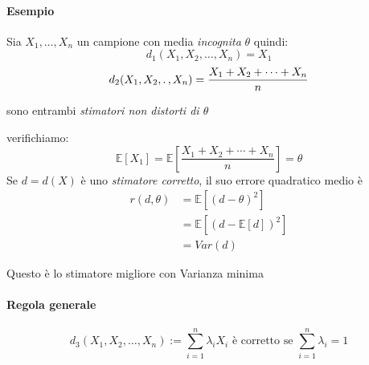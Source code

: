 \documentclass[]{article}
\newcommand{\ev}{\mathbb{E}[X]}
\renewcommand{\ev}[1]{\mathbb{E}[#1]}
\begin{document}
    \paragraph{Esempio} Sia $X_1, \ldots, X_n$ un campione con media \textit{incognita} $\theta$ quindi:
    \[ d_1 (X_1, X_2, \ldots, X_n) = X_1 \]
    \[ d_2 (X_1, X_2, \ldotp, X_n) = \frac{X_1 + X_2 + \cdots + X_n}{n} \]
    \centerline{sono entrambi \textit{stimatori non distorti di $\theta$}}
    verifichiamo:
    \[ \ev{X_1} = \ev{\frac{X_1 + X_2 + \cdots + X_n}{n}} = \theta \]
    Se $d = d(X)$ è uno \textit{stimatore corretto}, il suo errore quadratico medio è
    \begin{equation*}
        \begin{split}
            r(d, \theta) &= \ev{(d- \theta)^2} \\
            &= \ev{(d-\ev{d})^2} \\
            &= Var(d)
        \end{split}
    \end{equation*}
    \centerline{Questo è lo stimatore migliore con Varianza minima}
    \paragraph{Regola generale}
    \[ d_3(X_1, X_2, \ldots, X_n) := \sum_{i=1}^{n} \lambda_i X_i \text{  è corretto se } \sum_{i=1}^{n} \lambda_i = 1 \] 
\end{document}
